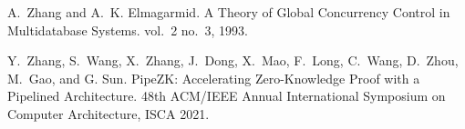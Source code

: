 \documentclass[11pt,dvipdfm]{article}
\begin{document}
\begin{thebibliography}{10}
\begin{small}
	A.\ Zhang and
               A.\ K. Elmagarmid.
               \newblock A Theory of Global Concurrency Control in Multidatabase Systems.
                vol.\ 2 no.\ 3, 1993.
               
 	Y.\ Zhang,
               S.\ Wang,
               X.\ Zhang,
               J.\ Dong,
               X.\ Mao,
               F.\ Long,
               C.\ Wang,
               D.\ Zhou,
               M.\ Gao, and
               G.  Sun.
	\newblock PipeZK: Accelerating Zero-Knowledge Proof with a Pipelined Architecture.
  	\newblock 48th {ACM/IEEE} Annual International Symposium on Computer Architecture,
               {ISCA} 2021.

\end{small}
\end{thebibliography}
\end{document}
